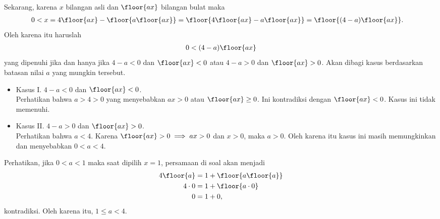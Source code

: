     Sekarang, karena $x$ bilangan asli dan $\floor{ax}$ bilangan bulat maka
    \begin{align*}
        0 < x &= 4\floor{ax} - \floor{a\floor{ax}} = \floor{4\floor{ax} - a\floor{ax}} = \floor{(4-a)\floor{ax}}.
    \end{align*}
    Oleh karena itu haruslah
    \begin{align*}
        0 < (4-a)\floor{ax}
    \end{align*}
    yang dipenuhi jika dan hanya jika $4-a < 0$ dan $\floor{ax} < 0$ atau $4-a > 0$ dan $\floor{ax} > 0$. Akan dibagi kasus berdasarkan batasan nilai $a$ yang mungkin tersebut.
    \begin{itemize}
        \item Kasus I. $4-a < 0$ dan $\floor{ax} < 0$.\\
        Perhatikan bahwa $a > 4 > 0$ yang menyebabkan $ax > 0$ atau $\floor{ax} \ge 0$. Ini kontradiksi dengan $\floor{ax} < 0$. Kasus ini tidak memenuhi.
        \item Kasus II. $4-a > 0$ dan $\floor{ax} > 0$.\\
        Perhatikan bahwa $a < 4$. Karena $\floor{ax} > 0 \implies ax > 0$ dan $x > 0$, maka $a > 0$. Oleh karena itu kasus ini masih memungkinkan dan menyebabkan $0 < a < 4$.
    \end{itemize}

    \newpage
    
    Perhatikan, jika $0 < a < 1$ maka saat dipilih $x=1$, persamaan di soal akan menjadi
    \begin{align*}
        4\floor{a} &= 1 + \floor{a\floor{a}}\\
        4 \cdot 0 &= 1 + \floor{a \cdot 0}\\
        0 &= 1 + 0,
    \end{align*}
    kontradiksi. Oleh karena itu, $1 \le a < 4$.
    
